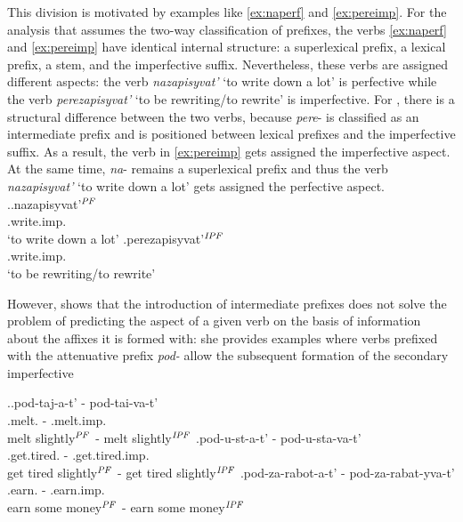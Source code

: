 This division is motivated by examples like \ref{ex:naperf} and \ref{ex:pereimp}. For the analysis that assumes the two-way classification of prefixes, the verbs \ref{ex:naperf} and \ref{ex:pereimp} have identical internal structure: a superlexical prefix, a lexical prefix, a stem, and the imperfective suffix. Nevertheless, these verbs are assigned different aspects: the verb \textit{nazapisyvat'} `to write down a lot' is perfective while the verb \textit{perezapisyvat'} `to be rewriting/to rewrite' is imperfective. For \citet{Tatevosov:07}, there is a structural difference between the two verbs, because \textit{pere}- is classified as an intermediate prefix and is positioned between lexical prefixes and the imperfective suffix. As a result, the verb in \ref{ex:pereimp} gets assigned the imperfective aspect. At the same time, \textit{na}- remains a superlexical prefix and thus the verb \textit{nazapisyvat'} `to write down a lot' gets assigned the perfective aspect.
\ex.\ag.\label{ex:naperf}nazapisyvat'$^{{\mathit{PF}}}$\\
.write.imp.\\
`to write down a lot'
\bg.\label{ex:pereimp}perezapisyvat'$^{{\mathit{IPF}}}$\\
.write.imp.\\
`to be rewriting/to rewrite'

However, \cite{Kagan:book} shows that the introduction of intermediate prefixes does not solve the problem of predicting the aspect of a given verb on the basis of information about the affixes it is formed with: she provides examples where verbs prefixed with the attenuative prefix \textit{pod-} allow the subsequent formation of the secondary imperfective \citep[35, ex.~\ref{ex:pod} here]{Kagan:book}

\ex.\label{ex:pod}\ag.pod-taj-a-t' - pod-tai-va-t'\\
.melt. - .melt.imp.\\
melt slightly$^{\mathit{PF}}$ - melt slightly$^{\mathit{IPF}}$
\bg.\label{ex:podustavat'}pod-u-st-a-t' - pod-u-sta-va-t'\\
.get.tired. - .get.tired.imp.\\
get tired slightly$^{\mathit{PF}}$ - get tired slightly$^{\mathit{IPF}}$
\bg.\label{ex:podzarabatyvat'}pod-za-rabot-a-t' - pod-za-rabat-yva-t'\\
.earn. - .earn.imp.\\
earn some money$^{\mathit{PF}}$ - earn some money$^{\mathit{IPF}}$

